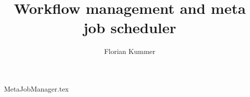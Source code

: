 \documentclass[10pt,a4paper]{article}
\title{Workflow management and meta job scheduler}
\author{Florian Kummer}
\begin{document}
\maketitle

{MetaJobManager.tex}
\end{document}

